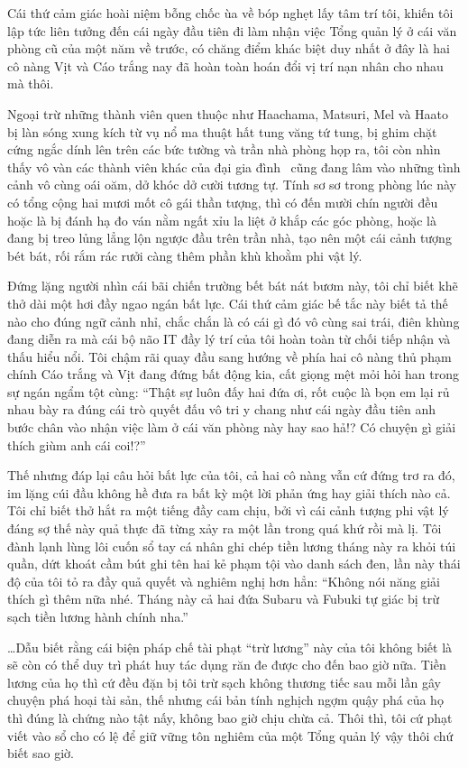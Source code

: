 \documentclass[../main.tex]{subfiles}
\begin{document}
Cái thứ cảm giác hoài niệm bỗng chốc ùa về bóp nghẹt lấy tâm trí tôi, khiến tôi lập tức liên tưởng đến cái ngày đầu tiên đi làm nhận việc Tổng quản lý ở cái văn phòng cũ của một năm về trước, có chăng điểm khác biệt duy nhất ở đây là hai cô nàng Vịt và Cáo trắng nay đã hoàn toàn hoán đổi vị trí nạn nhân cho nhau mà thôi.

Ngoại trừ những thành viên quen thuộc như Haachama, Matsuri, Mel và Haato bị làn sóng xung kích từ vụ nổ ma thuật hất tung văng tứ tung, bị ghim chặt cứng ngắc dính lên trên các bức tường và trần nhà phòng họp ra, tôi còn nhìn thấy vô vàn các thành viên khác của đại gia đình \hll\ cũng đang lâm vào những tình cảnh vô cùng oái oăm, dở khóc dở cười tương tự. Tính sơ sơ trong phòng lúc này có tổng cộng hai mươi mốt cô gái thần tượng, thì có đến mười chín người đều hoặc là bị đánh hạ đo ván nằm ngất xỉu la liệt ở khắp các góc phòng, hoặc là đang bị treo lủng lẳng lộn ngược đầu trên trần nhà, tạo nên một cái cảnh tượng bét bát, rối rắm rác rưởi càng thêm phần khù khoằm phi vật lý.

Đứng lặng người nhìn cái bãi chiến trường bết bát nát bươm này, tôi chỉ biết khẽ thở dài một hơi đầy ngao ngán bất lực. Cái thứ cảm giác bế tắc này biết tả thế nào cho đúng ngữ cảnh nhỉ, chắc chắn là có cái gì đó vô cùng sai trái, điên khùng đang diễn ra mà cái bộ não IT đầy lý trí của tôi hoàn toàn từ chối tiếp nhận và thấu hiểu nổi. Tôi chậm rãi quay đầu sang hướng về phía hai cô nàng thủ phạm chính Cáo trắng và Vịt đang đứng bất động kia, cất giọng mệt mỏi hỏi han trong sự ngán ngẩm tột cùng: ``Thật sự luôn đấy hai đứa ơi, rốt cuộc là bọn em lại rủ nhau bày ra đúng cái trò quyết đấu vô tri y chang như cái ngày đầu tiên anh bước chân vào nhận việc làm ở cái văn phòng này hay sao hả!? Có chuyện gì giải thích giùm anh cái coi!?''

Thế nhưng đáp lại câu hỏi bất lực của tôi, cả hai cô nàng vẫn cứ đứng trơ ra đó, im lặng cúi đầu không hề đưa ra bất kỳ một lời phản ứng hay giải thích nào cả. Tôi chỉ biết thở hắt ra một tiếng đầy cam chịu, bởi vì cái cảnh tượng phi vật lý đáng sợ thế này quả thực đã từng xảy ra một lần trong quá khứ rồi mà lị. Tôi đành lạnh lùng lôi cuốn sổ tay cá nhân ghi chép tiền lương tháng này ra khỏi túi quần, dứt khoát cầm bút ghi tên hai kẻ phạm tội vào danh sách đen, lần này thái độ của tôi tỏ ra đầy quả quyết và nghiêm nghị hơn hẳn: ``Không nói năng giải thích gì thêm nữa nhé. Tháng này cả hai đứa Subaru và Fubuki tự giác bị trừ sạch tiền lương hành chính nha.''

\dots Dẫu biết rằng cái biện pháp chế tài phạt ``trừ lương'' này của tôi không biết là sẽ còn có thể duy trì phát huy tác dụng răn đe được cho đến bao giờ nữa. Tiền lương của họ thì cứ đều đặn bị tôi trừ sạch không thương tiếc sau mỗi lần gây chuyện phá hoại tài sản, thế nhưng cái bản tính nghịch ngợm quậy phá của họ thì đúng là chứng nào tật nấy, không bao giờ chịu chừa cả. Thôi thì, tôi cứ phạt viết vào sổ cho có lệ để giữ vững tôn nghiêm của một Tổng quản lý vậy thôi chứ biết sao giờ.
\end{document}
